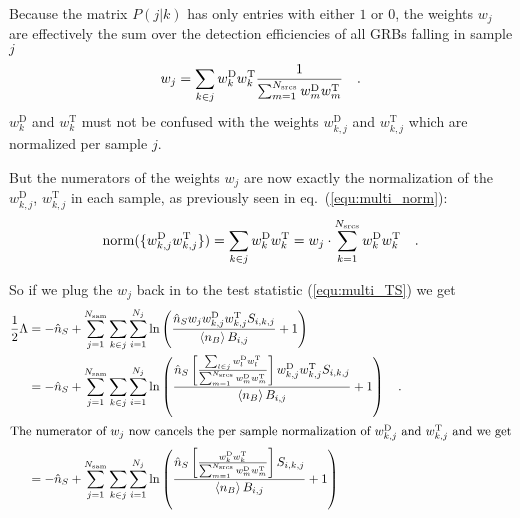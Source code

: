 Because the matrix $P(j|k)$ has only entries with either $1$ or $0$, the weights $w_j$ are effectively the sum over the detection efficiencies of all GRBs falling in sample $j$
\begin{equation}
  w_j = \sum_{k\in j} w^\text{D}_k w^\text{T}_k
        \frac{1}{\sum_{m=1}^{N_\text{srcs}} w^\text{D}_m w^\text{T}_m}
      \quad\text{.}
\end{equation}
$w^\text{D}_k$ and $w^\text{T}_k$ must not be confused with the weights $w_{k,j}^\text{D}$ and $w_{k,j}^\text{T}$ which are normalized per sample $j$.

But the numerators of the weights $w_j$ are now exactly the normalization of the $w_{k,j}^\text{D}$, $w_{k,j}^\text{T}$ in each sample, as previously seen in eq.~(\ref{equ:multi_norm}):
\begin{equation}
  \text{norm}(\{w_{k,j}^\text{D}w_{k,j}^\text{T}\})
    = \sum_{k\in j} w^\text{D}_k w^\text{T}_k
    = w_j \cdot \sum_{k=1}^{N_\text{srcs}} w^\text{D}_k w^\text{T}_k
  \quad\text{.}
\end{equation}

So if we plug the $w_j$ back in to the test statistic (\ref{equ:multi_TS}) we get
\begin{align}
  \frac{1}{2}\Lambda &=
    -\hat{n}_S + \sum_{j=1}^{N_\text{sam}}
            \sum_{k\in j}\sum_{i=1}^{N_j} \ln\left(
              \frac{\hat{n}_S w_j w_{k,j}^\text{D}w_{k,j}^\text{T}S_{i,k,j}}
                   {\Braket{n_B} B_{i,j}} + 1 \right) \\
    &= -\hat{n}_S + \sum_{j=1}^{N_\text{sam}}
            \sum_{k\in j}\sum_{i=1}^{N_j} \ln\left(
              \frac{\hat{n}_S \left[
                      \frac{\sum_{l\in j} w^\text{D}_l w^\text{T}_l }
                           {\sum_{m=1}^{N_\text{srcs}} w^\text{D}_m w^\text{T}_m}
                      \right] w_{k,j}^\text{D}w_{k,j}^\text{T}S_{i,k,j}}
                   {\Braket{n_B} B_{i,j}} + 1 \right)
       \quad\text{.} \\
  \intertext{The numerator of $w_j$ now cancels the per sample normalization of $w_{k,j}^\text{D}$ and $w_{k,j}^\text{T}$ and we get}
    &= -\hat{n}_S + \sum_{j=1}^{N_\text{sam}}
            \sum_{k\in j}\sum_{i=1}^{N_j} \ln\left(
              \frac{\hat{n}_S \left[
                      \frac{ w_k^\text{D}w_k^\text{T} }
                           {\sum_{m=1}^{N_\text{srcs}} w^\text{D}_m w^\text{T}_m}
                      \right] S_{i,k,j}}
                   {\Braket{n_B} B_{i,j}} + 1 \right)
\end{align}


